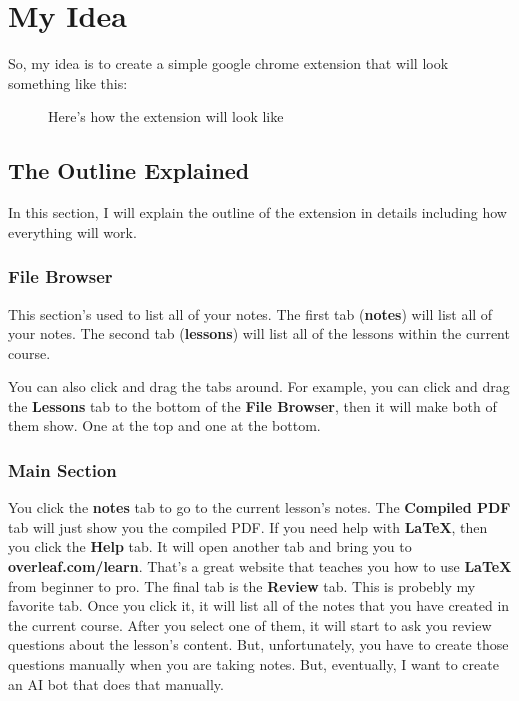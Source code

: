 \chapter{My Idea}
\label{chap:my_idea}

So, my idea is to create a simple google chrome extension that will look
something like this:

\begin{figure}[h]
    \centering
    \caption{Here's how the extension will look like}
    \label{fig:outline}
\end{figure}

\section{The Outline Explained}
\label{sec:the_outline_explained}

In this section, I will explain the outline of the extension in details
including how everything will work.

\subsection{File Browser}
\label{sub_sec:file_browser}

This section's used to list all of your notes. The first tab (\textbf{notes})
will list all of your notes. The second tab (\textbf{lessons}) will list all of
the lessons within the current course.

You can also click and drag the tabs around. For example, you can click and drag
the \textbf{Lessons} tab to the bottom of the \textbf{File Browser}, then it
will make both of them show. One at the top and one at the bottom.


\subsection{Main Section}
\label{sub_sec:main_section}

You click the \textbf{notes} tab to go to the current lesson's notes. The
\textbf{Compiled PDF} tab will just show you the compiled PDF.
If you need help with \textbf{LaTeX}, then you click the \textbf{Help} tab. It
will open another tab and bring you to \textbf{overleaf.com/learn}. That's a
great website that teaches you how to use \textbf{LaTeX} from beginner to pro.
The final tab is the \textbf{Review} tab. This is probebly my favorite tab.
Once you click it, it will list all of the notes that you have created in the
current course. After you select one of them, it will start to ask you review
questions about the lesson's content. But, unfortunately, you have to create
those questions manually when you are taking notes. But, eventually, I want to
create an AI bot that does that manually.

